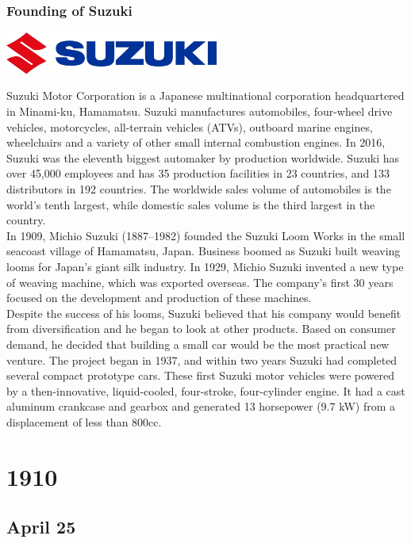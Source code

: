 \documentclass[11pt]{report}
\begin{document}
\subsection{Founding of Suzuki}
\vspace{2mm}\begin{center}\includegraphics[width=7cm]{./img/suzukiLogo.jpg}\end{center}
Suzuki Motor Corporation is a Japanese multinational corporation headquartered in Minami-ku, Hamamatsu. Suzuki manufactures automobiles, four-wheel drive vehicles, motorcycles, all-terrain vehicles (ATVs), outboard marine engines, wheelchairs and a variety of other small internal combustion engines. In 2016, Suzuki was the eleventh biggest automaker by production worldwide. Suzuki has over 45,000 employees and has 35 production facilities in 23 countries, and 133 distributors in 192 countries. The worldwide sales volume of automobiles is the world's tenth largest, while domestic sales volume is the third largest in the country.\\ \indent In 1909, Michio Suzuki (1887–1982) founded the Suzuki Loom Works in the small seacoast village of Hamamatsu, Japan. Business boomed as Suzuki built weaving looms for Japan's giant silk industry. In 1929, Michio Suzuki invented a new type of weaving machine, which was exported overseas. The company's first 30 years focused on the development and production of these machines.\\ \indent Despite the success of his looms, Suzuki believed that his company would benefit from diversification and he began to look at other products. Based on consumer demand, he decided that building a small car would be the most practical new venture. The project began in 1937, and within two years Suzuki had completed several compact prototype cars. These first Suzuki motor vehicles were powered by a then-innovative, liquid-cooled, four-stroke, four-cylinder engine. It had a cast aluminum crankcase and gearbox and generated 13 horsepower (9.7 kW) from a displacement of less than 800cc.

\chapter{1910}
\section{April 25}
\end{document}
